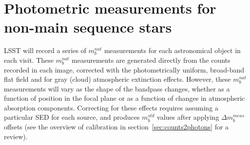\documentclass[12pt,preprint]{aastex}
\newcommand{\water}   {H\textsubscript{2}O}
\begin{document}
%
%  
%


\section{Photometric measurements for non-main sequence stars}
\label{sec:photo_better}

LSST will record a series of $m_b^{nat}$ measurements for each
astronomical object in each visit. These $m_b^{nat}$ measurements are
generated directly from the counts recorded in each image, corrected
with the photometrically uniform, broad-band flat field and for gray
(cloud) atmospheric extinction effects. However, these $m_b^{nat}$
measurements will vary as the shape of the bandpass changes, whether
as a function of position in the focal plane or as a function of
changes in atmospheric absorption components. Correcting for these
effects requires assuming a particular SED for each source, and
produces $m_b^{std}$ values after applying $\Delta m_b^{meas}$ offsets
(see the overview of calibration in section~\ref{sec:counts2photons}
for a review).
\end{document}
